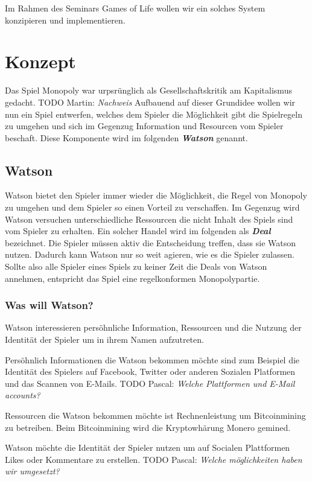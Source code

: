\documentclass[german]{cgspaper} %
\newcommand{\todo}[1]{\textit{#1}}
\newcommand{\Martin}[1]{\textcolor{colorMartin}{TODO Martin:} \todo{#1} }
\newcommand{\Pascal}[1]{\textcolor{colorPascal}{TODO Pascal:} \todo{#1} }
\newcommand{\neuerBegriff}[1]{\textbf{\textit{#1}}}
\begin{document}
Im Rahmen des Seminars Games of Life wollen wir ein solches System konzipieren und implementieren.

\section{Konzept}

Das Spiel Monopoly war urpsrünglich als Gesellschaftskritik am Kapitalismus gedacht. \Martin{Nachweis} 
Aufbauend auf dieser Grundidee wollen wir nun ein Spiel entwerfen, welches dem Spieler die Möglichkeit gibt die Spielregeln zu umgehen und sich im Gegenzug Information und Resourcen vom Spieler beschaft. 
Diese Komponente wird im folgenden \neuerBegriff{Watson} genannt.

\subsection{Watson}

Watson bietet den Spieler immer wieder die Möglichkeit, die Regel von Monopoly zu umgehen und dem Spieler so einen Vorteil zu verschaffen.
Im Gegenzug wird Watson versuchen unterschiedliche Ressourcen die nicht Inhalt des Spiels sind vom Spieler zu erhalten.
Ein solcher Handel wird im folgenden als \neuerBegriff{Deal} bezeichnet.
Die Spieler müssen aktiv die Entscheidung treffen, dass sie Watson nutzen.
Dadurch kann Watson nur so weit agieren, wie es die Spieler zulassen.
Sollte also alle Spieler eines Spiels zu keiner Zeit die Deals von Watson annehmen, entspricht das Spiel eine regelkonformen Monopolypartie.

\subsubsection{Was will Watson?}

Watson interessieren persöhnliche Information, Ressourcen und die Nutzung der Identität der Spieler um in ihrem Namen aufzutreten.

Persöhnlich Informationen die Watson bekommen möchte sind zum Beispiel die Identität des Spielers auf Facebook, Twitter oder anderen Sozialen Platformen und das Scannen von E-Mails.
\Pascal{Welche Plattformen und E-Mail accounts?}

Ressourcen die Watson bekommen möchte ist Rechnenleistung um Bitcoinmining zu betreiben.
Beim Bitcoinmining wird die Kryptowhärung Monero gemined.

Watson möchte die Identität der Spieler nutzen um auf Socialen Plattformen Likes oder Kommentare zu erstellen.
\Pascal{Welche möglichkeiten haben wir umgesetzt?}
\end{document}
